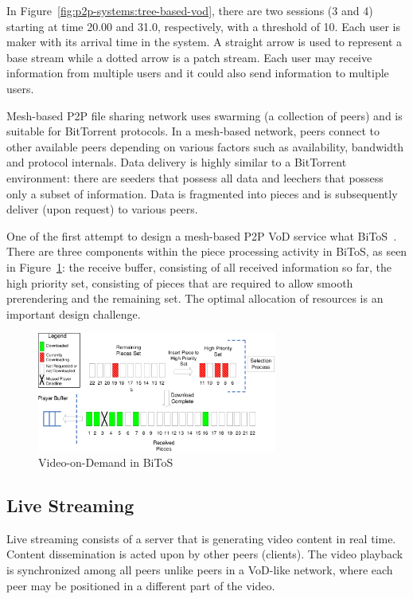 In Figure~\ref{fig:p2p-systems:tree-based-vod}, there are two sessions (3 and 4) starting
at time 20.00 and
31.0, respectively, with a threshold of 10. Each user is maker with its
arrival time in the system. A straight arrow is used to represent a base
stream while a dotted arrow is a patch stream. Each user may receive
information from multiple users and it could also send information to multiple
users.

Mesh-based P2P file sharing network uses swarming (a collection of peers) and
is suitable for BitTorrent protocols. In a mesh-based network, peers connect
to other available peers depending on various factors such as availability,
bandwidth and protocol internals. Data delivery is highly similar to a
BitTorrent environment: there are seeders that possess all data and leechers
that possess only a subset of information. Data is fragmented into pieces and
is subsequently deliver (upon request) to various peers.

One of the first attempt to design a mesh-based P2P VoD service what
BiToS~\cite{bitos}. There are three components within the piece processing
activity in BiToS, as seen in Figure~\ref{fig:p2p-systems:bitos-vod}: the receive buffer, consisting of
all received information so far, the high priority set, consisting of pieces
that are required to allow smooth prerendering and the remaining set. The
optimal allocation of resources is an important design challenge.

\begin{figure}
  \centering
  \includegraphics[width=0.7\textwidth]{src/img/p2p-systems/bitos-vod}
  \caption{Video-on-Demand in BiToS}
  \label{fig:p2p-systems:bitos-vod}
\end{figure}

\subsection{Live Streaming}
\label{subsec:p2p-systems:ls}

Live streaming consists of a server that is generating video content in real
time. Content dissemination is acted upon by other peers (clients). The video
playback is synchronized among all peers unlike peers in a VoD-like network,
where each peer may be positioned in a different part of the video.

